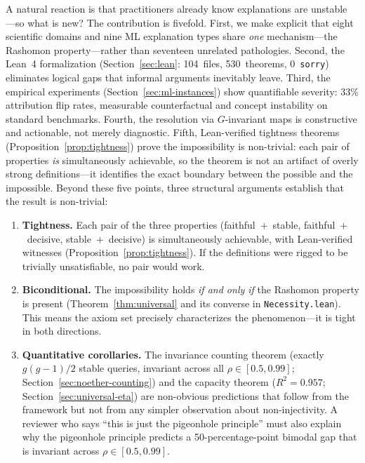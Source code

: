 \documentclass[11pt,a4paper]{article}
\begin{document}
A natural reaction is that practitioners already know explanations are unstable
---so what is new?  The contribution is fivefold.  First, we make explicit that
eight scientific domains and nine ML explanation types share \emph{one}
mechanism---the Rashomon property---rather than seventeen unrelated
pathologies.  Second, the Lean~4
formalization (Section~\ref{sec:lean}: 104~files, 530~theorems, 0~\texttt{sorry})
eliminates logical gaps that informal arguments inevitably leave.  Third, the
empirical experiments (Section~\ref{sec:ml-instances}) show quantifiable severity:
33\% attribution flip rates, measurable counterfactual and concept instability on
standard benchmarks.  Fourth, the resolution via $G$-invariant maps is
constructive and actionable, not merely diagnostic.  Fifth, Lean-verified
tightness theorems (Proposition~\ref{prop:tightness}) prove the impossibility
is non-trivial: each pair of properties \emph{is} simultaneously achievable,
so the theorem is not an artifact of overly strong definitions---it identifies
the exact boundary between the possible and the impossible.
Beyond these five points, three structural arguments establish that the
result is non-trivial:

\begin{enumerate}
  \item \textbf{Tightness.}  Each pair of the three properties
    (faithful~$+$~stable, faithful~$+$~decisive, stable~$+$~decisive) is
    simultaneously achievable, with Lean-verified witnesses
    (Proposition~\ref{prop:tightness}).  If the definitions were rigged to be
    trivially unsatisfiable, no pair would work.

  \item \textbf{Biconditional.}  The impossibility holds \emph{if and only if}
    the Rashomon property is present (Theorem~\ref{thm:universal} and
    its converse in \texttt{Necessity.lean}).  This means the axiom set
    precisely characterizes the phenomenon---it is tight in both
    directions.

  \item \textbf{Quantitative corollaries.}  The invariance counting theorem
    (exactly $g(g{-}1)/2$ stable queries, invariant across all
    $\rho \in [0.5, 0.99]$; Section~\ref{sec:noether-counting}) and the
    capacity theorem ($R^2 = 0.957$; Section~\ref{sec:universal-eta}) are non-obvious
    predictions that follow from the framework but not from any simpler
    observation about non-injectivity.  A reviewer who says ``this is just the
    pigeonhole principle'' must also explain why the pigeonhole principle
    predicts a 50-percentage-point bimodal gap that is invariant across
    $\rho \in [0.5, 0.99]$.
\end{enumerate}
\end{document}
